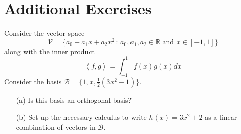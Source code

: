 \newpage\section{Additional Exercises}


\begin{problem}
   Consider the vector space  
   \[ \mathcal{V} = \{a_0 + a_1 x + a_2 x^2 \, : \, a_0, a_1, a_2 \in
       \mathbb{R} \text{ and } x \in [-1,1] \} \]
    along with the inner product 
    \[ \left< f,g\right> = \int_{-1}^1 f(x) g(x) dx \]
    Consider the basis $\mathcal{B} = \{1,x,\frac{1}{2}(3x^2-1)\}$.  
    \begin{enumerate}
        \item[(a)] Is this basis an orthogonal basis?
        \item[(b)] Set up the necessary calculus to write $h(x) = 3x^2+2$ as a linear
            combination of vectors in $\mathcal{B}$.
    \end{enumerate}
\end{problem}


